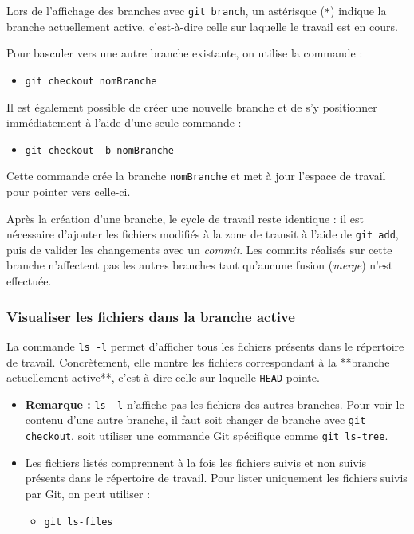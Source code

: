 \documentclass{article}
\begin{document}
Lors de l’affichage des branches avec \texttt{git branch}, un astérisque (\texttt{*}) indique la branche actuellement active, c’est-à-dire celle sur laquelle le travail est en cours.

Pour basculer vers une autre branche existante, on utilise la commande :
\begin{itemize}
    \item \texttt{git checkout nomBranche}
\end{itemize}

Il est également possible de créer une nouvelle branche et de s’y positionner immédiatement à l’aide d’une seule commande :
\begin{itemize}
    \item \texttt{git checkout -b nomBranche}
\end{itemize}
Cette commande crée la branche \texttt{nomBranche} et met à jour l’espace de travail pour pointer vers celle-ci.

Après la création d’une branche, le cycle de travail reste identique : il est nécessaire d’ajouter les fichiers modifiés à la zone de transit à l’aide de \texttt{git add}, puis de valider les changements avec un \emph{commit}. Les commits réalisés sur cette branche n’affectent pas les autres branches tant qu’aucune fusion (\emph{merge}) n’est effectuée.

\subsubsection{Visualiser les fichiers dans la branche active}

La commande \texttt{ls -l} permet d’afficher tous les fichiers présents dans le répertoire de travail. Concrètement, elle montre les fichiers correspondant à la **branche actuellement active**, c’est-à-dire celle sur laquelle \texttt{HEAD} pointe.

\begin{itemize}
    \item \textbf{Remarque :} \texttt{ls -l} n’affiche pas les fichiers des autres branches. Pour voir le contenu d’une autre branche, il faut soit changer de branche avec \texttt{git checkout}, soit utiliser une commande Git spécifique comme \texttt{git ls-tree}.
    \item Les fichiers listés comprennent à la fois les fichiers suivis et non suivis présents dans le répertoire de travail. Pour lister uniquement les fichiers suivis par Git, on peut utiliser :
    \begin{itemize}
        \item \texttt{git ls-files}
    \end{itemize}
\end{itemize}
\end{document}

